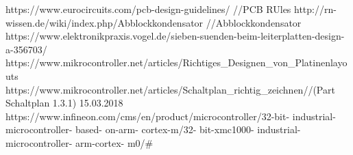 https://www.eurocircuits.com/pcb-design-guidelines/ //PCB RUles
http://rn-wissen.de/wiki/index.php/Abblockkondensator  //Abblockkondensator
https://www.elektronikpraxis.vogel.de/sieben-suenden-beim-leiterplatten-design-a-356703/
https://www.mikrocontroller.net/articles/Richtiges_Designen_von_Platinenlayouts
https://www.mikrocontroller.net/articles/Schaltplan_richtig_zeichnen//(Part Schaltplan 1.3.1) 15.03.2018
https://www.infineon.com/cms/en/product/microcontroller/32-bit- industrial-microcontroller- based-
on-arm- cortex-m/32- bit-xmc1000- industrial-microcontroller- arm-cortex- m0/\#\\
